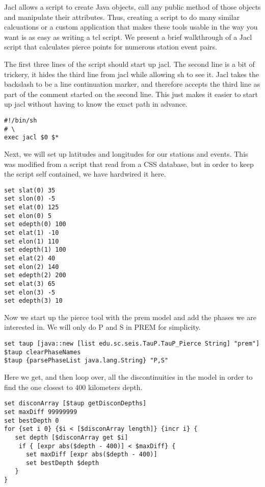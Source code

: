 Jacl allows a script to create Java objects, call any public method of
those objects and manipulate their attributes. Thus, creating a script
to do many similar calcuations or a custom application that makes these tools
usable in the way you want is as easy as writing a tcl script. We present a
brief walkthrough of a Jacl script that calculates pierce points for
numerous station event pairs.

The first three lines of the script should start up jacl. The second line is 
a bit of trickery, it hides the third line from jacl while allowing sh to see
it. Jacl takes the backslash to be a line continuation marker, and therefore
accepts the third line as part of the comment started on the second line. 
This just makes it easier to start up jacl without having to know the exact 
path in advance.

\begin{verbatim}
#!/bin/sh
# \
exec jacl $0 $*
\end{verbatim}

Next, we will set up latitudes and longitudes for our stations and events. 
This was modified from a script that read from a CSS database, but in 
order to keep the script self contained, we have hardwired it here.
\begin{verbatim}
set slat(0) 35
set slon(0) -5
set elat(0) 125
set elon(0) 5
set edepth(0) 100
set elat(1) -10
set elon(1) 110
set edepth(1) 100
set elat(2) 40
set elon(2) 140
set edepth(2) 200
set elat(3) 65
set elon(3) -5
set edepth(3) 10
\end{verbatim}

Now we start up the pierce tool with the prem model
 and add the phases we are interested in. We will
only do P and S in PREM for simplicity.
\begin{verbatim}
set taup [java::new [list edu.sc.seis.TauP.TauP_Pierce String] "prem"]
$taup clearPhaseNames
$taup {parsePhaseList java.lang.String} "P,S"
\end{verbatim}

Here we get, and then loop over, all the discontinuities in the model in order
to find the one closest to 400 kilometers depth.
\begin{verbatim}
set disconArray [$taup getDisconDepths]
set maxDiff 99999999
set bestDepth 0
for {set i 0} {$i < [$disconArray length]} {incr i} {
   set depth [$disconArray get $i]
	if { [expr abs($depth - 400)] < $maxDiff} {
      set maxDiff [expr abs($depth - 400)]
      set bestDepth $depth
   }
}
\end{verbatim}

